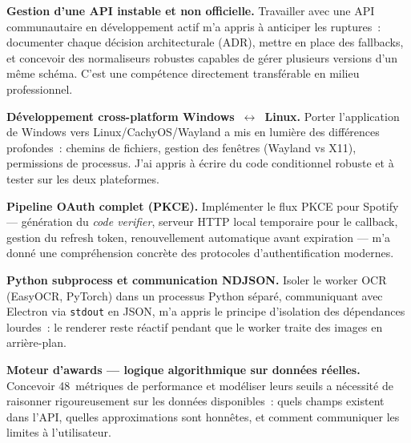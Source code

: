 \documentclass[12pt,a4paper]{article}
\begin{document}
\textbf{Gestion d'une API instable et non officielle.}
Travailler avec une API communautaire en développement actif m'a appris
à anticiper les ruptures~: documenter chaque décision architecturale
(ADR), mettre en place des fallbacks, et concevoir des normaliseurs
robustes capables de gérer plusieurs versions d'un même schéma. C'est
une compétence directement transférable en milieu professionnel.

\textbf{Développement cross-platform Windows~$\leftrightarrow$~Linux.}
Porter l'application de Windows vers Linux/CachyOS/Wayland a mis en
lumière des différences profondes~: chemins de fichiers, gestion des
fenêtres (Wayland vs X11), permissions de processus. J'ai appris à
écrire du code conditionnel robuste et à tester sur les deux plateformes.

\textbf{Pipeline OAuth complet (PKCE).}
Implémenter le flux PKCE pour Spotify --- génération du
\textit{code verifier}, serveur HTTP local temporaire pour le callback,
gestion du refresh token, renouvellement automatique avant expiration ---
m'a donné une compréhension concrète des protocoles d'authentification
modernes.

\textbf{Python subprocess et communication NDJSON.}
Isoler le worker OCR (EasyOCR, PyTorch) dans un processus Python séparé,
communiquant avec Electron via \texttt{stdout} en JSON, m'a appris le
principe d'isolation des dépendances lourdes~: le renderer reste réactif
pendant que le worker traite des images en arrière-plan.

\textbf{Moteur d'awards --- logique algorithmique sur données réelles.}
Concevoir 48~métriques de performance et modéliser leurs seuils a nécessité
de raisonner rigoureusement sur les données disponibles~: quels champs
existent dans l'API, quelles approximations sont honnêtes, et comment
communiquer les limites à l'utilisateur.
\end{document}
